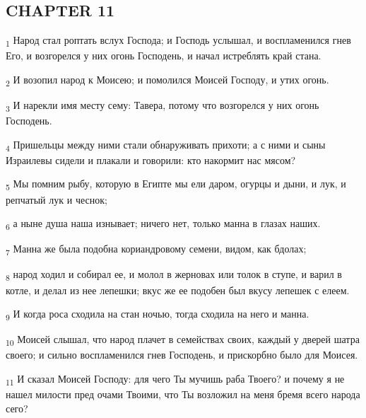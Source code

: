 \subsection{CHAPTER 11}
\begin{tcolorbox}
\textsubscript{1} Народ стал роптать вслух Господа; и Господь услышал, и воспламенился гнев Его, и возгорелся у них огонь Господень, и начал истреблять край стана.
\end{tcolorbox}
\begin{tcolorbox}
\textsubscript{2} И возопил народ к Моисею; и помолился Моисей Господу, и утих огонь.
\end{tcolorbox}
\begin{tcolorbox}
\textsubscript{3} И нарекли имя месту сему: Тавера, потому что возгорелся у них огонь Господень.
\end{tcolorbox}
\begin{tcolorbox}
\textsubscript{4} Пришельцы между ними стали обнаруживать прихоти; а с ними и сыны Израилевы сидели и плакали и говорили: кто накормит нас мясом?
\end{tcolorbox}
\begin{tcolorbox}
\textsubscript{5} Мы помним рыбу, которую в Египте мы ели даром, огурцы и дыни, и лук, и репчатый лук и чеснок;
\end{tcolorbox}
\begin{tcolorbox}
\textsubscript{6} а ныне душа наша изнывает; ничего нет, только манна в глазах наших.
\end{tcolorbox}
\begin{tcolorbox}
\textsubscript{7} Манна же была подобна кориандровому семени, видом, как бдолах;
\end{tcolorbox}
\begin{tcolorbox}
\textsubscript{8} народ ходил и собирал ее, и молол в жерновах или толок в ступе, и варил в котле, и делал из нее лепешки; вкус же ее подобен был вкусу лепешек с елеем.
\end{tcolorbox}
\begin{tcolorbox}
\textsubscript{9} И когда роса сходила на стан ночью, тогда сходила на него и манна.
\end{tcolorbox}
\begin{tcolorbox}
\textsubscript{10} Моисей слышал, что народ плачет в семействах своих, каждый у дверей шатра своего; и сильно воспламенился гнев Господень, и прискорбно было для Моисея.
\end{tcolorbox}
\begin{tcolorbox}
\textsubscript{11} И сказал Моисей Господу: для чего Ты мучишь раба Твоего? и почему я не нашел милости пред очами Твоими, что Ты возложил на меня бремя всего народа сего?
\end{tcolorbox}
